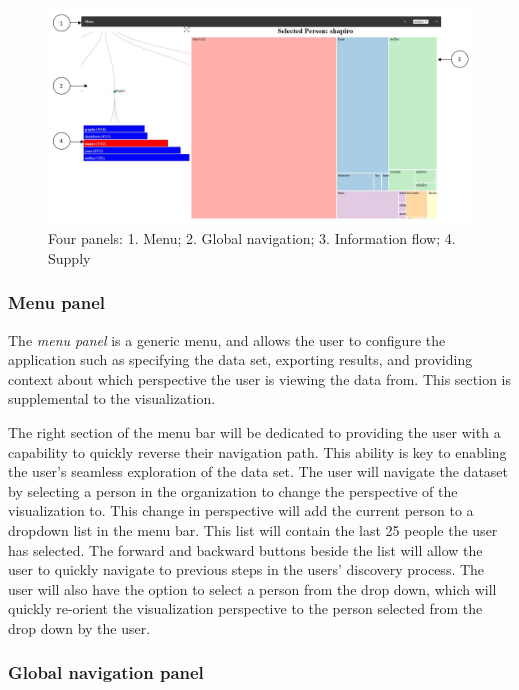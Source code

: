 \documentclass[12pt,letterpaper]{article}
\begin{document}
\begin{figure}
  \centering
  \includegraphics[width=\columnwidth]{pics/whole_app_numbers.jpg}
  \caption[All panels]{Four panels: 1. Menu; 2. Global navigation; 3. Information flow; 4. Supply}
  \label{fig:allpanels}
\end{figure}

\subsubsection{Menu panel}

The \emph{menu panel} is a generic menu, and allows the user to configure the application such as specifying the data set, exporting results, and providing context about which perspective the user is viewing the data from. This section is supplemental to the visualization.  

The right section of the menu bar will be dedicated to providing the user with a capability to quickly reverse their navigation path.  This ability is key to enabling the user’s seamless exploration of the data set.  The user will navigate the dataset by selecting a person in the organization to change the perspective of the visualization to.  This change in perspective will add the current person to a dropdown list in the menu bar.  This list will contain the last 25 people the user has selected.  The forward and backward buttons beside the list will allow the user to quickly navigate to previous steps in the users’ discovery process.  The user will also have the option to select a person from the drop down, which will quickly re-orient the visualization perspective to the person selected from the drop down by the user.

\subsubsection{Global navigation panel}
\end{document}
